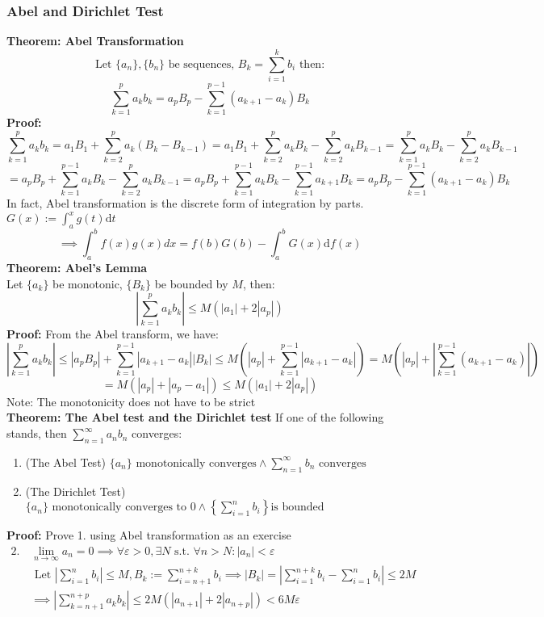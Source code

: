 \documentclass{article}
\newcommand{\0}{{\bf{0}}}
\begin{document}
\subsubsection{Abel and Dirichlet Test}
\textbf{Theorem: Abel Transformation}
$$\mbox{Let }\{a_n\},\{b_n\}\mbox{ be sequences, }B_k=\sum_{i=1}^kb_i\mbox{ then:}$$
$$\sum_{k=1}^pa_kb_k=a_pB_p-\sum_{k=1}^{p-1}(a_{k+1}-a_k)B_k$$
\textbf{Proof:}
$$\sum_{k=1}^pa_kb_k=a_1B_1+\sum_{k=2}^pa_k(B_k-B_{k-1})=a_1B_1+\sum_{k=2}^pa_kB_k-\sum_{k=2}^pa_kB_{k-1}=\sum_{k=1}^pa_kB_k-\sum_{k=2}^pa_kB_{k-1}$$
$$=a_pB_p+\sum_{k=1}^{p-1}a_kB_k-\sum_{k=2}^pa_kB_{k-1}=a_pB_p+\sum_{k=1}^{p-1}a_kB_k-\sum_{k=1}^{p-1}a_{k+1}B_k=a_pB_p-\sum_{k=1}^{p-1}(a_{k+1}-a_k)B_k$$
In fact, Abel transformation is the discrete form of integration by parts. $G(x):=\displaystyle\int_a^xg(t)\mbox{d}t$
$$\implies\int_a^bf(x)g(x)dx=f(b)G(b)-\int_a^bG(x)\mbox{d}f(x)$$
\textbf{Theorem: Abel's Lemma}\\
Let $\{a_k\}$ be monotonic, $\{B_k\}$ be bounded by $M$, then:
$$\left|\sum_{k=1}^pa_kb_k\right|\le M(|a_1|+2|a_p|)$$
\textbf{Proof:}
From the Abel transform, we have: 
$$\left|\sum_{k=1}^pa_kb_k\right|\le|a_pB_p|+\sum_{k=1}^{p-1}|a_{k+1}-a_k||B_k|\le M\left(|a_p|+\sum_{k=1}^{p-1}|a_{k+1}-a_k|\right)=M\left(|a_p|+\left|\sum_{k=1}^{p-1}(a_{k+1}-a_k)\right|\right)$$
$$=M(|a_p|+|a_p-a_1|)\le M(|a_1|+2|a_p|)$$
\null\hfill{Note: The monotonicity does not have to be strict}\\
\textbf{Theorem: The Abel test and the Dirichlet test}
If one of the following stands, then $\sum\limits_{n=1}^\infty a_nb_n$ converges:
\begin{enumerate}
    \item (The Abel Test) $\{a_n\}\mbox{ monotonically converges}\land\sum\limits_{n=1}^\infty b_n\mbox{ converges}$
    \item (The Dirichlet Test) $\{a_n\}\mbox{ monotonically converges to 0}\land\left\{\sum\limits_{i=1}^nb_i\right\}\mbox{is bounded}$
\end{enumerate}
\textbf{Proof:}
\null\hfill{Prove 1. using Abel transformation as an exercise}
\begin{equation}
\begin{split}
    2.\,&\lim_{n\to\infty}a_n=0\implies\forall\varepsilon>0,\exists N\mbox{ s.t. }\forall n>N:|a_n|<\varepsilon\\
    &\mbox{ Let }\left|\sum_{i=1}^nb_i\right|\le M,B_k:=\sum_{i=n+1}^{n+k}b_i\implies|B_k|=\left|\sum_{i=1}^{n+k}b_i-\sum_{i=1}^nb_i\right|\le2M\\
    &\implies\left|\sum_{k=n+1}^{n+p}a_kb_k\right|\le2M(|a_{n+1}|+2|a_{n+p}|)<6M\varepsilon\\
\end{split}
\end{equation}
\end{document}
